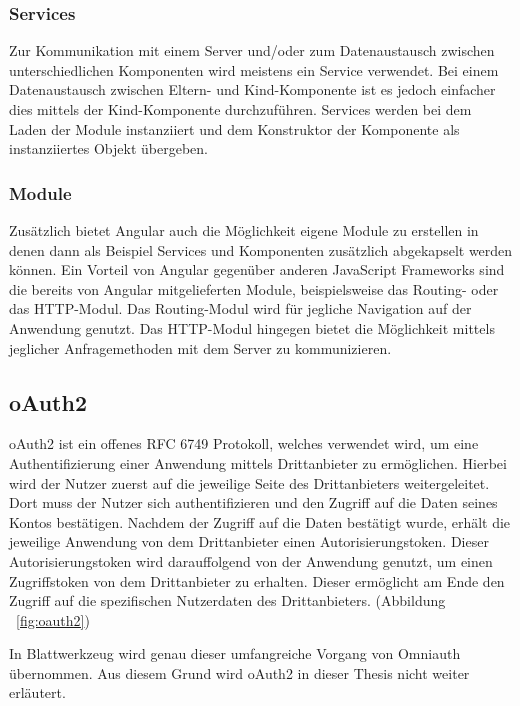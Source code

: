 \subsubsection{Services}
\label{sec: ang-service}
Zur Kommunikation mit einem Server und/oder zum Datenaustausch zwischen unterschiedlichen Komponenten wird meistens ein Service verwendet. Bei einem Datenaustausch zwischen Eltern- und Kind-Komponente ist es jedoch einfacher dies mittels der Kind-Komponente durchzuführen. Services werden bei dem Laden der Module instanziiert und dem Konstruktor der Komponente als instanziiertes Objekt übergeben.

\subsubsection{Module}
\label{sec: ang-modul}
Zusätzlich bietet Angular auch die Möglichkeit eigene Module zu erstellen in denen dann als Beispiel Services und Komponenten zusätzlich abgekapselt werden können. Ein Vorteil von Angular gegenüber anderen JavaScript Frameworks sind die bereits von Angular mitgelieferten Module, beispielsweise das Routing- oder das HTTP-Modul. Das Routing-Modul wird für jegliche Navigation auf der Anwendung genutzt. Das \gls{HTTP}-Modul hingegen bietet die Möglichkeit mittels jeglicher Anfragemethoden mit dem Server zu kommunizieren.

\subsection{oAuth2}
\label{sec: oauth2}
\gls{oAuth2} ist ein offenes \gls{RFC} 6749 Protokoll, welches verwendet wird, um eine Authentifizierung einer Anwendung mittels Drittanbieter zu ermöglichen. Hierbei wird der Nutzer zuerst auf die jeweilige Seite des Drittanbieters weitergeleitet. Dort muss der Nutzer sich authentifizieren und den Zugriff auf die Daten seines Kontos bestätigen. Nachdem der Zugriff auf die Daten bestätigt wurde, erhält die jeweilige Anwendung von dem Drittanbieter einen Autorisierungstoken. Dieser Autorisierungstoken wird darauffolgend von der Anwendung genutzt, um einen Zugriffstoken von dem Drittanbieter zu erhalten. Dieser ermöglicht am Ende den Zugriff auf die spezifischen Nutzerdaten des Drittanbieters. (Abbildung ~\ref{fig:oauth2})

In Blattwerkzeug wird genau dieser umfangreiche Vorgang von Omniauth übernommen. Aus diesem Grund wird oAuth2 in dieser Thesis nicht weiter erläutert.

